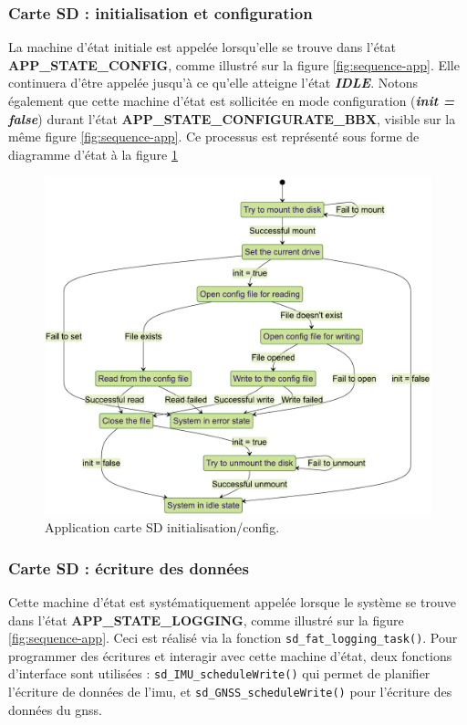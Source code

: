 \subsubsection{Carte SD : initialisation et configuration}

La machine d'état initiale est appelée lorsqu'elle se trouve dans l'état \textbf{APP\_STATE\_CONFIG}, comme illustré sur la figure \ref{fig:sequence-app}. Elle continuera d'être appelée jusqu'à ce qu'elle atteigne l'état \textbf{\textit{IDLE}}. Notons également que cette machine d'état est sollicitée en mode configuration (\textbf{\textit{init = false}}) durant l'état \textbf{APP\_STATE\_CONFIGURATE\_BBX}, visible sur la même figure \ref{fig:sequence-app}. Ce processus est représenté sous forme de diagramme d'état à la figure \ref{fig:sd-card-init}



\begin{figure}[h]
	\centering
	\includegraphics[width=1\linewidth]{../figures/code/diagrammes/sd-card-Init}
	\caption{Application carte SD initialisation/config.}
	\label{fig:sd-card-init}
\end{figure}

\clearpage

\subsubsection{Carte SD : écriture des données}
Cette machine d'état est systématiquement appelée lorsque le système se trouve dans l'état \textbf{APP\_STATE\_LOGGING}, comme illustré sur la figure \ref{fig:sequence-app}. Ceci est réalisé via la fonction \verb*|sd_fat_logging_task()|. Pour programmer des écritures et interagir avec cette machine d'état, deux fonctions d'interface sont utilisées : \verb*|sd_IMU_scheduleWrite()| qui permet de planifier l'écriture de données de l'\gls{imu}, et \verb*|sd_GNSS_scheduleWrite()| pour l'écriture des données du \gls{gnss}.

